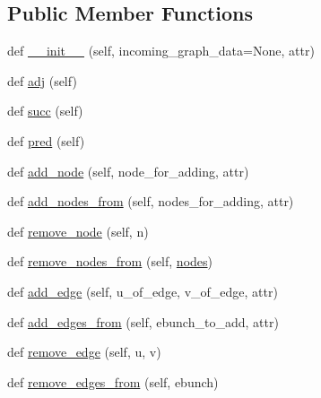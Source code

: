 \subsection*{Public Member Functions}
\begin{DoxyCompactItemize}
\item 
def \hyperlink{classnetworkx_1_1classes_1_1digraph_1_1DiGraph_a505f7e2f0dd2ce9f8c2a2ce40bd8953b}{\+\_\+\+\_\+init\+\_\+\+\_\+} (self, incoming\+\_\+graph\+\_\+data=None, attr)
\item 
def \hyperlink{classnetworkx_1_1classes_1_1digraph_1_1DiGraph_a8b30e5c48fa7b7a0ef8feb255e93456f}{adj} (self)
\item 
def \hyperlink{classnetworkx_1_1classes_1_1digraph_1_1DiGraph_aa222645f98f3e9743907061e2e9bc804}{succ} (self)
\item 
def \hyperlink{classnetworkx_1_1classes_1_1digraph_1_1DiGraph_ab3c66a8f8cdedf35802d8b6bc0dd6ba6}{pred} (self)
\item 
def \hyperlink{classnetworkx_1_1classes_1_1digraph_1_1DiGraph_a449f037ac6d92569e66dbce5eefda8c3}{add\+\_\+node} (self, node\+\_\+for\+\_\+adding, attr)
\item 
def \hyperlink{classnetworkx_1_1classes_1_1digraph_1_1DiGraph_adf4b6877599ad1dbe4cbe6ff7bd88d02}{add\+\_\+nodes\+\_\+from} (self, nodes\+\_\+for\+\_\+adding, attr)
\item 
def \hyperlink{classnetworkx_1_1classes_1_1digraph_1_1DiGraph_af725955087213a720569ba114a2ec413}{remove\+\_\+node} (self, n)
\item 
def \hyperlink{classnetworkx_1_1classes_1_1digraph_1_1DiGraph_a1f34bb3d0447c0064ca0d9a9a4e0d938}{remove\+\_\+nodes\+\_\+from} (self, \hyperlink{classnetworkx_1_1classes_1_1graph_1_1Graph_ab5b03b460e5b1f2a06feaddcfb4fda3a}{nodes})
\item 
def \hyperlink{classnetworkx_1_1classes_1_1digraph_1_1DiGraph_aaef139198e13df992c54df319202ea8e}{add\+\_\+edge} (self, u\+\_\+of\+\_\+edge, v\+\_\+of\+\_\+edge, attr)
\item 
def \hyperlink{classnetworkx_1_1classes_1_1digraph_1_1DiGraph_a307a16c2da683dec6ce4c2dd73cf2448}{add\+\_\+edges\+\_\+from} (self, ebunch\+\_\+to\+\_\+add, attr)
\item 
def \hyperlink{classnetworkx_1_1classes_1_1digraph_1_1DiGraph_a4a83f58a73325d6466293ad127842daa}{remove\+\_\+edge} (self, u, v)
\item 
def \hyperlink{classnetworkx_1_1classes_1_1digraph_1_1DiGraph_a40d5634c72fec954829abffe05aeecba}{remove\+\_\+edges\+\_\+from} (self, ebunch)

\end{DoxyCompactItemize}
